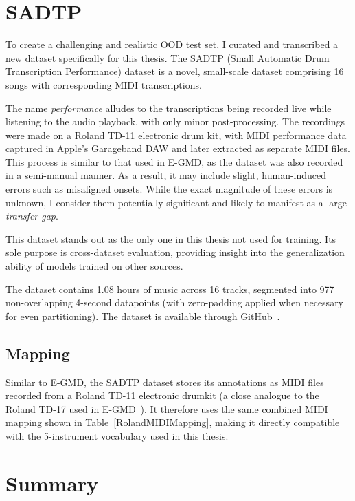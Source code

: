 \section{SADTP}

To create a challenging and realistic \acrfull{OOD} test set, I curated and transcribed a new dataset specifically for this thesis. The SADTP (Small Automatic Drum Transcription Performance) dataset is a novel, small-scale dataset comprising 16 songs with corresponding MIDI transcriptions. 

The name \textit{performance} alludes to the transcriptions being recorded live while listening to the audio playback, with only minor post-processing. The recordings were made on a Roland TD-11 electronic drum kit, with MIDI performance data captured in Apple's Garageband \gls{DAW} and later extracted as separate MIDI files. This process is similar to that used in E-GMD, as the dataset was also recorded in a semi-manual manner. As a result, it may include slight, human-induced errors such as misaligned onsets. While the exact magnitude of these errors is unknown, I consider them potentially significant and likely to manifest as a large \textit{transfer gap}.

This dataset stands out as the only one in this thesis not used for training. Its sole purpose is cross-dataset evaluation, providing insight into the generalization ability of models trained on other sources.

The dataset contains 1.08 hours of music across 16 tracks, segmented into 977 non-overlapping 4-second datapoints (with zero-padding applied when necessary for even partitioning). The dataset is available through GitHub~\cite{fosse_sadtp_2025}.

\subsection{Mapping}

Similar to E-GMD, the SADTP dataset stores its annotations as MIDI files recorded from a Roland TD-11 electronic drumkit (a close analogue to the Roland TD-17 used in E-GMD~\cite{callender2020improvingperceptualqualitydrum}). It therefore uses the same combined MIDI mapping shown in Table~\ref{RolandMIDIMapping}, making it directly compatible with the 5-instrument vocabulary used in this thesis.

\section{Summary}

